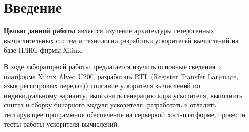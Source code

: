 \chapter*{Введение}

\textbf{Целью данной работы} является изучение архитектуры гетерогенных вычислительных систем и технологии разработки ускорителей вычислений на базе ПЛИС фирмы Xilinx.

В ходе лабораторной работы предлагается изучить основные сведения о платформе
Xilinx Alveo U200, разработать RTL (Register Transfer Language, язык
регистровых передач)) описание ускорителя вычислений по индивидуальному
варианту, выполнить генерацию ядра ускорителя, выполнить синтез и сборку
бинарного модуля ускорителя, разработать и отладить тестирующее программное
обеспечение на серверной хост-платформе, провести тесты работы ускорителя
вычислений.

